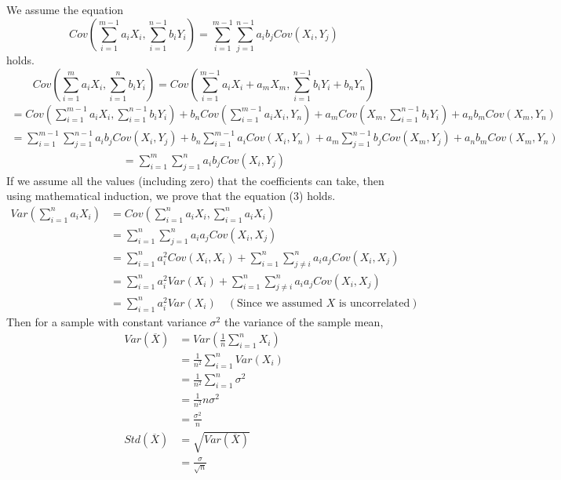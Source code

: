 \documentclass{article}
\numberwithin{equation}{subsection}
\begin{document}
We assume the equation
\begin{equation}
    Cov(\sum_{i=1}^{m-1} a_i X_i, \sum_{i=1}^{n-1} b_i Y_i) = \sum_{i=1}^{m-1} \sum_{j=1}^{n-1} a_i b_j Cov(X_i, Y_j)
\end{equation}
holds. 
\begin{equation}
    Cov(\sum_{i=1}^{m} a_i X_i, \sum_{i=1}^{n} b_i Y_i) = Cov(\sum_{i=1}^{m-1} a_i X_i + a_m X_m, \sum_{i=1}^{n-1} b_i Y_i + b_n Y_n)
\end{equation}
\begin{equation}
    \begin{split}
        =Cov(\sum_{i=1}^{m-1} a_i X_i,\sum_{i=1}^{n-1} b_i Y_i)+b_nCov(\sum_{i=1}^{m-1} a_i X_i,Y_n)+
        a_mCov(X_m,\sum_{i=1}^{n-1} b_i Y_i)+a_n b_mCov(X_m,Y_n)
    \end{split}
\end{equation}
\begin{equation}
    \begin{split}
         =\sum_{i=1}^{m-1} \sum_{j=1}^{n-1} a_i b_j Cov(X_i, Y_j)+b_n\sum_{i=1}^{m-1} a_iCov(X_i, Y_n)+a_m\sum_{j=1}^{n-1} b_j Cov(X_m, Y_j)+a_n b_mCov(X_m,Y_n)
    \end{split}
\end{equation}
\begin{equation}
    \begin{split}
         =\sum_{i=1}^{m} \sum_{j=1}^{n} a_i b_j Cov(X_i, Y_j)
    \end{split}
\end{equation}
If we assume all the values (including zero) that the coefficients can take, then using mathematical induction, we prove that the equation (3) holds. 
\begin{align}
    Var(\sum_{i=1}^{n} a_i X_i) &= Cov(\sum_{i=1}^{n} a_i X_i, \sum_{i=1}^{n} a_i X_i)\\
    &= \sum_{i=1}^{n} \sum_{j=1}^{n} a_i a_j Cov(X_i, X_j)\\
    &= \sum_{i=1}^{n} a_i^2 Cov(X_i, X_i) + \sum_{i=1}^{n} \sum_{j \neq i}^{n} a_i a_j Cov(X_i, X_j)\\
    &= \sum_{i=1}^{n} a_i^2 Var(X_i) + \sum_{i=1}^{n} \sum_{j \neq i}^{n} a_i a_j Cov(X_i, X_j)\\
    &= \sum_{i=1}^{n} a_i^2 Var(X_i) \quad (\text{Since we assumed $X$ is uncorrelated})
\end{align}
Then for a sample with constant variance $\sigma^2$ the variance of the sample mean,
\begin{align}
    Var(\overline{X}) &= Var(\frac{1}{n}\sum_{i=1}^{n} X_i)\\
    &= \frac{1}{n^2} \sum_{i=1}^{n} Var(X_i)\\
    &= \frac{1}{n^2} \sum_{i=1}^{n} \sigma^2\\
    &= \frac{1}{n^2} n \sigma^2\\
    &= \frac{\sigma^2}{n}\\
    Std(\overline{X}) &= \sqrt{Var(\overline{X})}\\
    &= \frac{\sigma}{\sqrt{n}}
\end{align}
\end{document}
